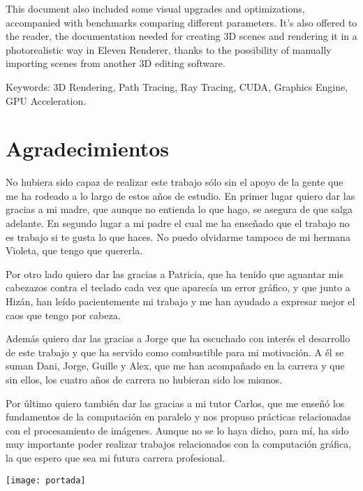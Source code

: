 This document also included some visual upgrades and optimizations, accompanied with benchmarks comparing different parameters. It's also offered to the reader, the documentation needed for creating 3D scenes and rendering it in a photorealistic way in Eleven Renderer, thanks to the possibility of manually importing scenes from another 3D editing software.

Keywords: 3D Rendering, Path Tracing, Ray Tracing, CUDA, Graphics Engine, GPU Acceleration.


\chapter*{Agradecimientos}

No hubiera sido capaz de realizar este trabajo sólo sin el apoyo de la gente que me ha rodeado a lo largo de estos años de estudio. En primer lugar quiero dar las gracias a mi madre, que aunque no entienda lo que hago, se asegura de que salga adelante. En segundo lugar a mi padre el cual me ha enseñado que el trabajo no es trabajo si te gusta lo que haces. No puedo olvidarme tampoco de mi hermana Violeta, que tengo que quererla.

Por otro lado quiero dar las gracias a Patricia, que ha tenido que aguantar mis cabezazos contra el teclado cada vez que aparecía un error gráfico, y que junto a Hizán, han leído pacientemente mi trabajo y me han ayudado a expresar mejor el caos que tengo por cabeza.

Además quiero dar las gracias a Jorge que ha escuchado con interés el desarrollo de este trabajo y que ha servido como combustible para mi motivación. A él se suman Dani, Jorge, Guille y Alex, que me han acompañado en la carrera y que sin ellos, los cuatro años de carrera no hubieran sido los mismos.

Por último quiero también dar las gracias a mi tutor Carlos, que me enseñó los fundamentos de la computación en paralelo y nos propuso prácticas relacionadas con el procesamiento de imágenes. Aunque no se lo haya dicho, para mí, ha sido muy importante poder realizar trabajos relacionados con la computación gráfica, la que espero que sea mi futura carrera profesional.


\newpage

\texttt{[image: portada]}

\scalebox{5}{\color{white}{Eleven Renderer}}

